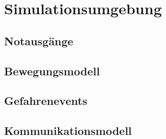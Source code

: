 \chapter{Simulationsumgebung}

\section{Notausgänge}

\section{Bewegungsmodell}

\section{Gefahrenevents}

\section{Kommunikationsmodell}